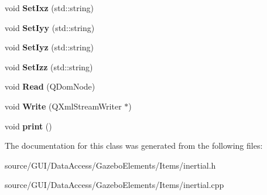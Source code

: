 \begin{DoxyCompactItemize}
\item 
void {\bfseries Set\+Ixz} (std\+::string)\label{class_inertial_a4657285882cf9453260efcc7a4d6a0b0}

\item 
void {\bfseries Set\+Iyy} (std\+::string)\label{class_inertial_acf3ddc98d75c5b7ea8d8409d1058bdd5}

\item 
void {\bfseries Set\+Iyz} (std\+::string)\label{class_inertial_a6815b10f07171961a41c3c28e16f0e03}

\item 
void {\bfseries Set\+Izz} (std\+::string)\label{class_inertial_adc44c3146b2899903ce157e601696a7b}

\item 
void {\bfseries Read} (Q\+Dom\+Node)\label{class_inertial_a2f76d7ea749ca92d632e17b266dbd080}

\item 
void {\bfseries Write} (Q\+Xml\+Stream\+Writer $\ast$)\label{class_inertial_aa3045fccb00ae372ac3fa89cdd84f55a}

\item 
void {\bfseries print} ()\label{class_inertial_aaff6e33ebd1913f2016581bf2eb047d5}

\end{DoxyCompactItemize}


The documentation for this class was generated from the following files\+:\begin{DoxyCompactItemize}
\item 
source/\+G\+U\+I/\+Data\+Access/\+Gazebo\+Elements/\+Items/inertial.\+h\item 
source/\+G\+U\+I/\+Data\+Access/\+Gazebo\+Elements/\+Items/inertial.\+cpp\end{DoxyCompactItemize}

